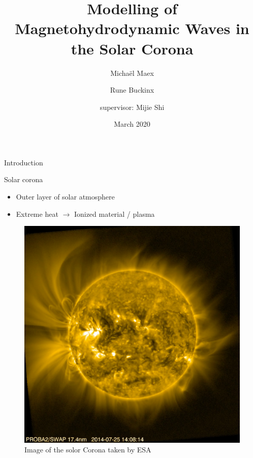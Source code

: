 \documentclass{beamer}
\title[]{Modelling of Magnetohydrodynamic Waves in the Solar Corona}
\author{\phantom{=/}  Micha\"el Maex \and Rune Buckinx \and supervisor: Mijie Shi }
\date{March 2020}
\begin{document}
\maketitle
\begin{frame}{Introduction} %
	\begin{minipage}{.54\linewidth}
    	Solar corona
	\begin{itemize}
	    \item Outer layer of solar atmosphere
	    \item Extreme heat $\longrightarrow$ Ionized material / plasma
	\end{itemize}
\end{minipage}
\hspace{.04\linewidth}
\begin{minipage}{.39\linewidth}
    \begin{figure}
        \centering
        \includegraphics[width=\textwidth]{figures/imagesolarco.png}
        \caption{Image of the solor Corona taken by ESA}
        \label{fig:my_label}
    \end{figure}
\end{minipage}
\end{frame}
\end{document}
